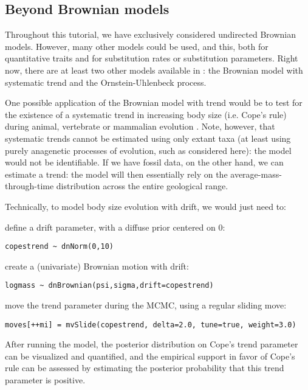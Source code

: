 \subsection{Beyond Brownian models}

Throughout this tutorial, we have exclusively considered undirected Brownian models.
However, many other models could be used,
and this,
both for quantitative traits and for substitution rates or substitution parameters.
Right now, there are at least two other models available in \RevBayes:
the Brownian model with systematic trend and the Ornstein-Uhlenbeck process.

One possible application of the Brownian model with trend would be to test for the existence of a systematic trend in increasing body size (i.e. Cope's rule) during animal, vertebrate or mammalian evolution \citep{Alroy1998}. Note, however, that systematic trends cannot be estimated using only extant taxa (at least using purely anagenetic processes of evolution, such as considered here): the model would not be identifiable.
If we have fossil data, on the other hand, we can estimate a trend:
the model will then essentially rely on the average-mass-through-time distribution across the entire geological range.

Technically, to model body size evolution with drift, we would just need to:

define a drift parameter, with a diffuse prior centered on 0:
{\tt \small \begin{snugshade*}
\begin{lstlisting}
copestrend ~ dnNorm(0,10)
\end{lstlisting}
\end{snugshade*}}
create a (univariate) Brownian motion with drift:
{\tt \small \begin{snugshade*}
\begin{lstlisting}
logmass ~ dnBrownian(psi,sigma,drift=copestrend)
\end{lstlisting}
\end{snugshade*}}
move the trend parameter during the MCMC, using a regular sliding move:
{\tt \small \begin{snugshade*}
\begin{lstlisting}
moves[++mi] = mvSlide(copestrend, delta=2.0, tune=true, weight=3.0)
\end{lstlisting}
\end{snugshade*}}

After running the model, the posterior distribution on Cope's trend parameter can be visualized and quantified, and the empirical support in favor of Cope's rule can be assessed by estimating the posterior probability that this trend parameter is positive.





